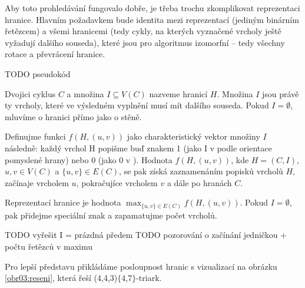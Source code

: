 Aby toto prohledávání fungovalo dobře, je třeba trochu zkomplikovat reprezentaci hranice. Hlavním požadavkem bude identita mezi reprezentací (jediným binárním řetězcem) a všemi hranicemi (tedy cykly, na kterých vyznačené vrcholy ještě vyžadují dalšího souseda), které jsou pro algoritmus izomorfní -- tedy všechny rotace a převrácení hranice.

TODO pseudokód

\begin{definice}\label{def01:1}
Dvojici cyklus $C$ a množina $I \subseteq V(C)$ nazveme hranicí $H$. Množina $I$ jsou právě ty vrcholy, které ve výsledném vyplnění musí mít dalšího souseda. Pokud  $I = \emptyset$, mluvíme o hranici přímo jako o stěně.

Definujme funkci $f(H,(u,v))$ jako charakteristický vektor množiny $I$ následně: každý vrchol H popišme buď znakem 1 (jako I v  podle orientace pomyslené hrany) nebo 0 (jako 0 v ). Hodnota $f(H, (u, v))$, kde $H=(C, I)$, $u, v \in V(C)$ a $ \lbrace u, v \rbrace \in E(C)$, se pak získá zaznamenáním popisků vrcholů $H$, začínaje vrcholem $u$, pokračujíce vrcholem $v$ a dále po hranách $C$. 

Reprezentací hranice je hodnota $\max_{\lbrace u, v \rbrace \in E(C)} {f(H,(u,v))}$. Pokud $I = \emptyset$, pak přidejme speciální znak a zapamatujme počet vrcholů.
\end{definice}

TODO vyřešit I = prázdná předem 
TODO pozorování o začínání jedničkou + počtu řetězců v maximu


Pro lepší představu přikládáme posloupnost hranic s vizualizací na obrázku \ref{obr03:reseni}, která řeší (4,4,3)$\lbrace$4,7$\rbrace$-triark. 

